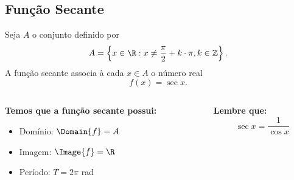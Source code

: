 \subsection{Função Secante}
\begin{frame}[t]
  \begin{definition}
    Seja $A$ o conjunto definido por
    \begin{equation*}
      A=\left\{x\in\R : x\not= \frac{\pi}{2} + k\cdot\pi, k\in\mathbb{Z}\right\}.
    \end{equation*}
    A função secante associa à cada $x\in A$ o número real
    \begin{equation*}
      f(x)=\sec{x}.
    \end{equation*}
  \end{definition}
  \begin{columns}[onlytextwidth]
    \begin{column}{0.49\textwidth}
      \begin{highlight}
        \textbf{Temos que a função secante possui:}
        \begin{itemize}
          \item Domínio: $\Domain{f} = A$
          \item Imagem: $\Image{f} = \R$
          \item Período: $T = 2\pi$ rad
        \end{itemize}
      \end{highlight}
    \end{column}
    \begin{column}{0.49\textwidth}
      \begin{highlight}
        \textbf{Lembre que:}
        \begin{equation*}
          \sec{x} = \frac{1}{\cos{x}}
        \end{equation*}
      \end{highlight}
    \end{column}
  \end{columns}
\end{frame}

\begin{frame}[c]
  \begin{figure}
  \end{figure}
\end{frame}

